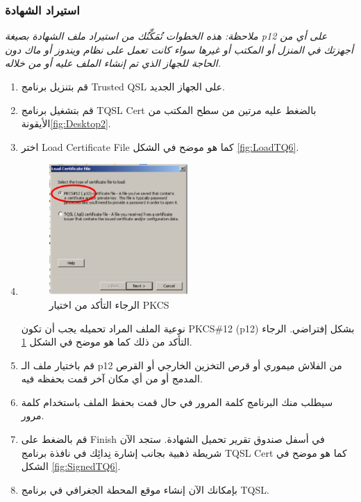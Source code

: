 \documentclass[a4paper,12pt]{article}
\begin{document}
\vspace{18pt}
\begin{center}
	\color{slategray2}
{\Huge \decoone}
\end{center}

\subsubsection{استيراد الشهادة\\}

\emph{ملاحظة: هذه الخطوات تُمَكِّنُك من استيراد ملف الشهادة بصيغة \textenglish{p12} على أي
من أجهزتك في المنزل أو المكتب أو غيرها سواء كانت تعمل على نظام
ويندوز أو ماك دون الحاجة للجهاز الذي تم إنشاء الملف عليه أو من خلاله.}

	\begin{enumerate}
		\item
		  قم بتنزيل برنامج \textenglish{Trusted QSL} على الجهاز الجديد.
		\item
		  قم بتشغيل برنامج \textenglish{TQSL Cert} بالضغط عليه مرتين من سطح المكتب من الأيقونة\ref{fig:Desktop2}.
		\item
		اختر \textenglish{Load Certificate File} كما هو موضح في الشكل \ref{fig:LoadTQ6}.
		\item
		\begin{figure}[!hbtp]
		\centering
		\includegraphics[width=0.5\textwidth]{pkcs.eps}
		\caption{الرجاء التأكد من اختيار \textenglish{PKCS}}
		\label{fig:SelectPKCS}
		\end{figure}
		  نوعية الملف المراد تحميله يجب أن تكون \textenglish{PKCS\#12} (\textenglish{p12}) بشكل إفتراضي.
		  الرجاء التأكد من ذلك كما هو موضح في الشكل \ref{fig:SelectPKCS}.
		\item
		  قم باختيار ملف الـ \textenglish{p12} من الفلاش ميموري أو قرص التخزين الخارجي أو
		  القرص المدمج أو من أي مكان آخر قمت بحفظه فيه.
		\item
		  سيطلب منك البرنامج كلمة المرور في حال قمت بحفظ الملف باستخدام كلمة
		  مرور.
		\item
		  قم بالضغط على \textenglish{Finish} في أسفل صندوق تقرير تحميل الشهادة. ستجد الآن
		  شريطة ذهبية بجانب إشارة نِدائِك في نافذة برنامج \textenglish{TQSL Cert} كما هو موضح في الشكل \ref{fig:SignedTQ6}.
		\item
		  بإمكانك الآن إنشاء موقع المحطة الجغرافي في برنامج \textenglish{TQSL}.
	\end{enumerate}
\end{document}
